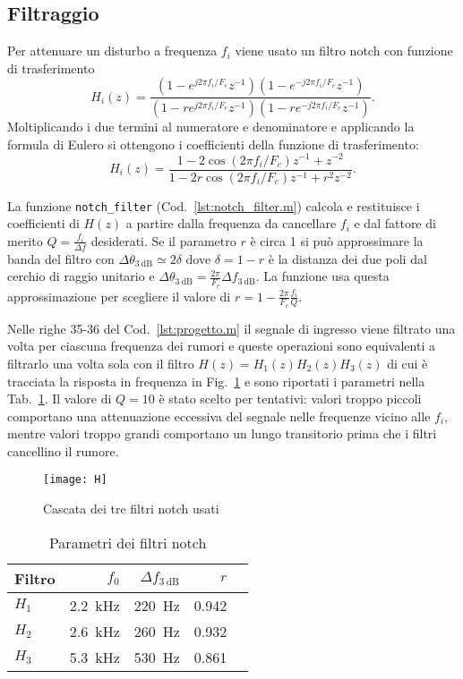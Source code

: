 \documentclass{article}
\newcommand{\fig}[1]{Fig.~\ref{#1}}
\newcommand{\cod}[1]{Cod.~\ref{#1}}
\newcommand{\tab}[1]{Tab.~\ref{#1}}
\newcommand{\inlcd}[1]{\lstinline[basicstyle=\ttfamily,keywordstyle={}]{#1}}
\begin{document}
\subsection{Filtraggio}
Per attenuare un disturbo a frequenza $f_i$ viene usato un filtro
notch con funzione di trasferimento
\begin{equation}
  H_i(z) = \frac{(1 - e^{j2\pi f_i/F_c}z^{-1})(1 - e^{-j2\pi f_i/F_c}z^{-1})}
    {(1 - re^{j2\pi f_i/F_c}z^{-1})(1 - re^{-j2\pi f_i/F_c}z^{-1})}.
\end{equation}
Moltiplicando i due termini al numeratore e denominatore e applicando
la formula di Eulero si ottengono i coefficienti della funzione di
trasferimento:
\begin{equation}
  H_i(z) = \frac{1 - 2\cos(2\pi f_i/F_c)z^{-1} + z^{-2}}
  {1 - 2r\cos(2\pi f_i/F_c)z^{-1} + r^2z^{-2}}.
\end{equation}

La funzione \inlcd{notch_filter} (\cod{lst:notch_filter.m}) calcola e
restituisce i coefficienti di $H(z)$ a partire dalla frequenza da
cancellare $f_i$ e dal fattore di merito $Q = \frac{f_i}{\Delta f}$
desiderati. Se il parametro $r$ è circa 1 si può approssimare la banda
del filtro con $\Delta \theta_{\SI{3}{\dB}} \simeq 2\delta$ dove
$\delta = 1 - r$ è la distanza dei due poli dal cerchio di raggio
unitario e $\Delta \theta_{\SI{3}{\dB}} = \frac{2\pi}{F_c}\Delta
f_{\SI{3}{\dB}}$. La funzione usa questa approssimazione per scegliere
il valore di $r = 1 - \frac{2\pi}{F_c} \frac{f_i}{Q}$.

Nelle righe 35-36 del \cod{lst:progetto.m} il segnale di ingresso
viene filtrato una volta per ciascuna frequenza dei rumori e queste
operazioni sono equivalenti a filtrarlo una volta sola con il filtro
$H(z) = H_1(z)H_2(z)H_3(z)$ di cui è tracciata la risposta in
frequenza in \fig{plot:notch} e sono riportati i parametri nella
\tab{tab:notch}. Il valore di $Q = 10$ è stato scelto per tentativi:
valori troppo piccoli comportano una attenuazione eccessiva del
segnale nelle frequenze vicino alle $f_i$, mentre valori troppo grandi
comportano un lungo transitorio prima che i filtri cancellino il
rumore.

\begin{figure}[h]
  \centering
  \texttt{[image: H]}
  \caption{Cascata dei tre filtri notch usati}
  \label{plot:notch}
\end{figure}

\begin{table}[h]
  \centering
  \begin{tabular}{lrrrr}
    Filtro & $f_0$                 & $\Delta f_{\SI{3}{\dB}}$ & $r$    \\
    \hline
    $H_1$  & \SI{2.2}{\kilo\hertz} & \SI{220}{\hertz}     & 0.942 \\
    $H_2$  & \SI{2.6}{\kilo\hertz} & \SI{260}{\hertz}     & 0.932 \\
    $H_3$  & \SI{5.3}{\kilo\hertz} & \SI{530}{\hertz}     & 0.861 \\
  \end{tabular}
  \caption{Parametri dei filtri notch}
  \label{tab:notch}
\end{table}
\end{document}
